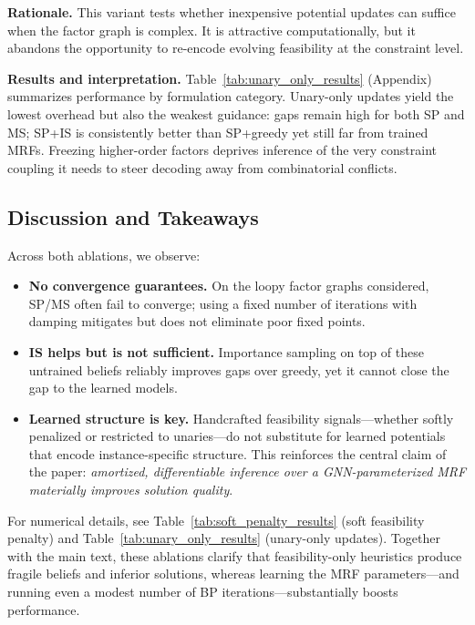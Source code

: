 \textbf{Rationale.}
This variant tests whether inexpensive potential updates can suffice when the factor graph is complex. It is attractive computationally, but it abandons the opportunity to re-encode evolving feasibility at the constraint level.

\textbf{Results and interpretation.}
Table~\ref{tab:unary_only_results} (Appendix) summarizes performance by formulation category. Unary-only updates yield the lowest overhead but also the weakest guidance: gaps remain high for both SP and MS; SP+IS is consistently better than SP+greedy yet still far from trained MRFs. Freezing higher-order factors deprives inference of the very constraint coupling it needs to steer decoding away from combinatorial conflicts.

\subsection{Discussion and Takeaways}
Across both ablations, we observe:
\begin{itemize}
  \item \textbf{No convergence guarantees.} On the loopy factor graphs considered, SP/MS often fail to converge; using a fixed number of iterations with damping mitigates but does not eliminate poor fixed points.
  \item \textbf{IS helps but is not sufficient.} Importance sampling on top of these untrained beliefs reliably improves gaps over greedy, yet it cannot close the gap to the learned models.
  \item \textbf{Learned structure is key.} Handcrafted feasibility signals—whether softly penalized or restricted to unaries—do not substitute for learned potentials that encode instance-specific structure. This reinforces the central claim of the paper: \emph{amortized, differentiable inference over a GNN-parameterized MRF materially improves solution quality}.
\end{itemize}

For numerical details, see Table~\ref{tab:soft_penalty_results} (soft feasibility penalty) and Table~\ref{tab:unary_only_results} (unary-only updates). Together with the main text, these ablations clarify that feasibility-only heuristics produce fragile beliefs and inferior solutions, whereas learning the MRF parameters—and running even a modest number of BP iterations—substantially boosts performance.


